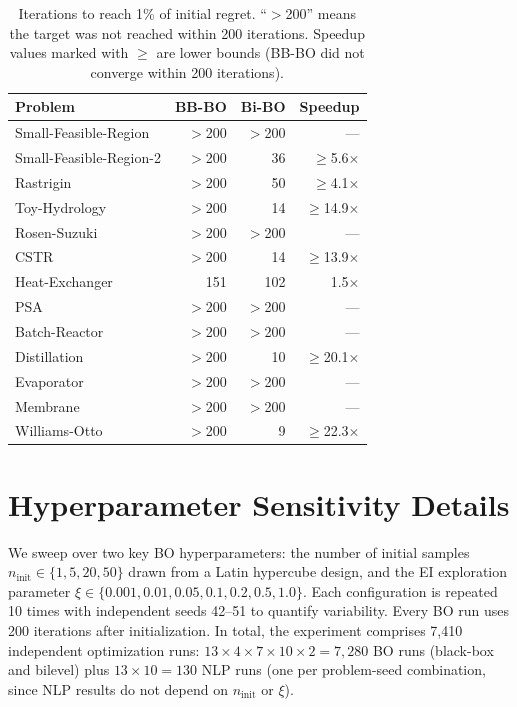 \documentclass[12pt,a4paper]{article}%
\theoremstyle{plain}%
\theoremstyle{remark}%
\theoremstyle{definition}%
\begin{document}
\begin{appendices}
\begin{table}[htbp]
\centering
\caption{Iterations to reach 1\% of initial regret. ``$>$200'' means the target was not reached within 200 iterations. Speedup values marked with $\geq$ are lower bounds (BB-BO did not converge within 200 iterations).}
\label{tab:convergence_speed}
\begin{tabular}{@{}lrrr@{}}
\toprule
\textbf{Problem} & \textbf{BB-BO} & \textbf{Bi-BO} & \textbf{Speedup} \\
\midrule
Small-Feasible-Region   & $>$200 & $>$200 & ---       \\
Small-Feasible-Region-2 & $>$200 & 36     & $\geq$5.6$\times$  \\
Rastrigin               & $>$200 & 50     & $\geq$4.1$\times$  \\
Toy-Hydrology           & $>$200 & 14     & $\geq$14.9$\times$ \\
Rosen-Suzuki            & $>$200 & $>$200 & ---       \\
CSTR                    & $>$200 & 14     & $\geq$13.9$\times$ \\
Heat-Exchanger          & 151    & 102    & 1.5$\times$  \\
PSA                     & $>$200 & $>$200 & ---       \\
Batch-Reactor           & $>$200 & $>$200 & ---       \\
Distillation            & $>$200 & 10     & $\geq$20.1$\times$ \\
Evaporator              & $>$200 & $>$200 & ---       \\
Membrane                & $>$200 & $>$200 & ---       \\
Williams-Otto           & $>$200 & 9      & $\geq$22.3$\times$ \\
\bottomrule
\end{tabular}
\end{table}

\section{Hyperparameter Sensitivity Details}\label{sec:hyperparameter_details}

We sweep over two key BO hyperparameters: the number of initial samples $n_\text{init} \in \{1, 5, 20, 50\}$ drawn from a Latin hypercube design, and the EI exploration parameter $\xi \in \{0.001, 0.01, 0.05, 0.1, 0.2, 0.5, 1.0\}$. Each configuration is repeated 10 times with independent seeds 42--51 to quantify variability. Every BO run uses 200 iterations after initialization. In total, the experiment comprises 7{,}410 independent optimization runs: $13 \times 4 \times 7 \times 10 \times 2 = 7{,}280$ BO runs (black-box and bilevel) plus $13 \times 10 = 130$ NLP runs (one per problem-seed combination, since NLP results do not depend on $n_\text{init}$ or $\xi$).


\end{appendices}
\end{document}

